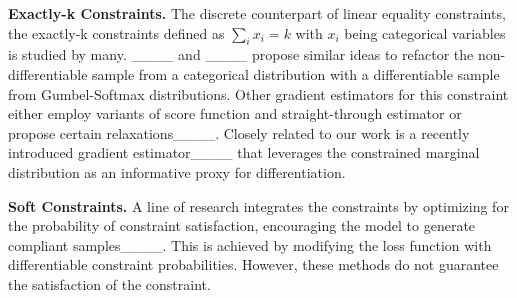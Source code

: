 \textbf{Exactly-k Constraints.}
The discrete counterpart of linear equality constraints, 
the exactly-k constraints defined as $\sum_i x_i = k$ with $x_i$ being categorical variables is studied by many.
____ and ____ propose similar ideas to refactor the non-differentiable sample from a categorical distribution with a differentiable sample from Gumbel-Softmax distributions. 
Other gradient estimators for this constraint
either employ variants of score function and straight-through estimator or propose certain relaxations____. 
Closely related to our work is
a recently introduced gradient estimator____ that leverages the
constrained marginal distribution as an informative proxy for differentiation.




\textbf{Soft Constraints.}
A line of research integrates the constraints by optimizing for the probability of constraint satisfaction, encouraging the model to generate compliant samples____.
This is achieved by modifying the loss function with differentiable constraint probabilities.
However, these methods do not guarantee the satisfaction of the constraint.